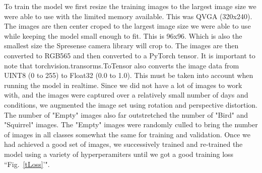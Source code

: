 \documentclass[conference]{IEEEtran}
\begin{document}
To train the model we first resize the training images to the largest image size we were able to use with the limited memory available. This was QVGA (320x240). The images are then center croped to the largest image size we were able to use while keeping the model small enough to fit. This is 96x96. Which is also the smallest size the Spresense camera library will crop to. The images are then converted to RGB565 and then converted to a PyTorch tensor. It is important to note that torchvision.transorms.ToTensor also converts the image data from UINT8 (0 to 255) to Float32 (0.0 to 1.0). This must be taken into account when running the model in realtime. Since we did not have a lot of images to work with, and the images were captured over a relatively small number of days and conditions, we augmented the image set using rotation and perspective distortion.  The number of "Empty" images also far outstretched the number of "Bird" and "Squirrel" images. The "Empty" images were randomly culled to bring the number of images in all classes somewhat the same for training and validation. Once we had achieved a good set of images, we successively trained and re-trained the model using a variety of hyperperamiters until we got a good training loss ``Fig.~\ref{tLoss}'". 
\end{document}
